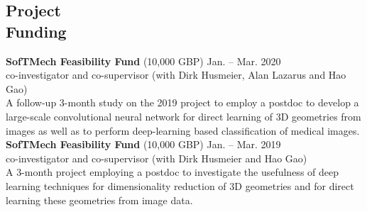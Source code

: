 \documentclass[margin,line]{resume}
\begin{document}
\begin{resume}
\vspace{-1mm}
 

\section{\mysidestyle Project\\ Funding}	
   	\textbf{SofTMech Feasibility Fund} (10,000 GBP)	\hfill Jan. -- Mar. 2020\\
     co-investigator and co-supervisor (with Dirk Husmeier, Alan Lazarus and Hao Gao)\\
    A follow-up 3-month study on the 2019 project to employ a postdoc to develop a large-scale convolutional neural network for direct learning of 3D geometries from images as well as  to perform deep-learning based classification of medical images.  \vspace{1.5mm}\\ 
   	\textbf{SofTMech Feasibility Fund} (10,000 GBP)	\hfill Jan. -- Mar. 2019\\
     co-investigator and co-supervisor (with Dirk Husmeier and Hao Gao) \\
    A 3-month project employing a postdoc to investigate the usefulness of deep learning techniques for dimensionality reduction of 3D geometries and for direct learning these geometries from image data.
    
\vspace{-1mm}
 

\end{resume}
\end{document}
